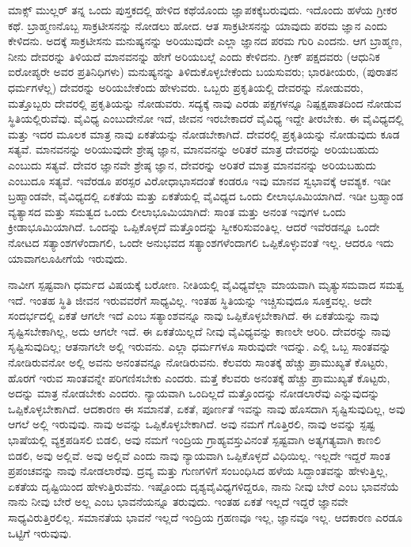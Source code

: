 \vskip 4pt

ಮಾಕ್ಸ್ ಮುಲ್ಲರ್ ತನ್ನ ಒಂದು ಪುಸ್ತಕದಲ್ಲಿ ಹೇಳಿದ ಕಥೆಯೊಂದು ಜ್ಞಾಪಕಕ್ಕೆ\break ಬರುವುದು. ಇದೊಂದು ಹಳೆಯ ಗ್ರೀಕರ ಕಥೆ. ಬ್ರಾಹ್ಮಣನೊಬ್ಬ ಸಾಕ್ರಟೀಸನನ್ನು ನೋಡಲು ಹೋದ. ಆತ ಸಾಕ್ರಟೀಸನನ್ನು ಯಾವುದು ಪರಮ ಜ್ಞಾನ ಎಂದು ಕೇಳಿದನು. ಅದಕ್ಕೆ ಸಾಕ್ರಟೀಸನು ಮನುಷ್ಯನನ್ನು ಅರಿಯುವುದೇ ಎಲ್ಲಾ ಜ್ಞಾನದ ಪರಮ ಗುರಿ ಎಂದನು. ಆಗ ಬ್ರಾಹ್ಮಣ, ನೀನು ದೇವರನ್ನು ತಿಳಿಯದೆ ಮಾನವನನ್ನು ಹೇಗೆ ಅರಿಯಬಲ್ಲೆ ಎಂದು ಕೇಳಿದನು. ಗ್ರೀಕ್ ಪಕ್ಷದವರು (ಆಧುನಿಕ ಐರೋಪ್ಯರೇ ಅವರ ಪ್ರತಿನಿಧಿಗಳು) ಮನುಷ್ಯನನ್ನು ತಿಳಿದುಕೊಳ್ಳಬೇಕೆಂದು ಬಯಸುವರು; ಭಾರತೀಯರು, (ಪುರಾತನ ಧರ್ಮಗಳೆಲ್ಲ) ದೇವರನ್ನು ಅರಿಯಬೇಕೆಂದು ಹೇಳುವರು. ಒಬ್ಬರು ಪ್ರಕೃತಿಯಲ್ಲಿ ದೇವರನ್ನು ನೋಡುವರು, ಮತ್ತೊಬ್ಬರು ದೇವರಲ್ಲಿ ಪ್ರಕೃತಿಯನ್ನು ನೋಡುವರು. ಸದ್ಯಕ್ಕೆ ನಾವು ಎರಡು ಪಕ್ಷಗಳನ್ನೂ ನಿಷ್ಪಕ್ಷಪಾತದಿಂದ ನೋಡುವ ಸ್ಥಿತಿಯಲ್ಲಿರುವೆವು. ವೈವಿಧ್ಯ ಎಂಬುದೇನೋ ಇದೆ, ಜೀವನ ಇರಬೇಕಾದರೆ ವೈವಿಧ್ಯ ಇದ್ದೇ ತೀರಬೇಕು. ಈ ವೈವಿಧ್ಯದಲ್ಲಿ ಮತ್ತು ಇದರ ಮೂಲಕ ಮಾತ್ರ ನಾವು ಏಕತೆಯನ್ನು ನೋಡಬೇಕಾಗಿದೆ. ದೇವರಲ್ಲಿ ಪ್ರಕೃತಿಯನ್ನು ನೋಡುವುದು ಕೂಡ ಸತ್ಯವೆ. ಮಾನವನನ್ನು ಅರಿಯುವುದೇ ಶ್ರೇಷ್ಠ ಜ್ಞಾನ, ಮಾನವನನ್ನು ಅರಿತರೆ ಮಾತ್ರ ದೇವರನ್ನು ಅರಿಯಬಹುದು ಎಂಬುದು ಸತ್ಯವೆ. ದೇವರ ಜ್ಞಾನವೇ ಶ್ರೇಷ್ಠ ಜ್ಞಾನ, ದೇವರನ್ನು ಅರಿತರೆ ಮಾತ್ರ ಮಾನವನನ್ನು ಅರಿಯಬಹುದು ಎಂಬುದೂ ಸತ್ಯವೆ. ಇವೆರಡೂ ಪರಸ್ಪರ ವಿರೋಧಾಭಾಸದಂತೆ ಕಂಡರೂ ಇವು ಮಾನವ ಸ್ವಭಾವಕ್ಕೆ ಆವಶ್ಯಕ. ಇಡೀ ಬ್ರಹ್ಮಾಂಡವೇ, ವೈವಿಧ್ಯದಲ್ಲಿ ಏಕತೆಯ ಮತ್ತು ಏಕತೆಯಲ್ಲಿ ವೈವಿಧ್ಯದ ಒಂದು ಲೀಲಾಭೂಮಿಯಾಗಿದೆ. ಇಡೀ ಬ್ರಹ್ಮಾಂಡ ವ್ಯತ್ಯಾಸದ ಮತ್ತು ಸಮತ್ವದ ಒಂದು ಲೀಲಾಭೂಮಿಯಾಗಿದೆ: ಸಾಂತ ಮತ್ತು ಅನಂತ ಇವುಗಳ ಒಂದು ಕ್ರೀಡಾಭೂಮಿಯಾಗಿದೆ. ಒಂದನ್ನು ಒಪ್ಪಿಕೊಳ್ಳದೆ ಮತ್ತೊಂದನ್ನು ಸ್ವೀಕರಿಸುವಂತಿಲ್ಲ. ಆದರೆ ಇವೆರಡನ್ನೂ ಒಂದೇ ನೋಟದ ಸತ್ಯಾಂಶಗಳೆಂದಾಗಲಿ, ಒಂದೇ ಅನುಭವದ ಸತ್ಯಾಂಶಗಳೆಂದಾಗಲಿ ಒಪ್ಪಿಕೊಳ್ಳುವಂತೆ ಇಲ್ಲ. ಆದರೂ ಇದು ಯಾವಾಗಲೂ\break ಹೀಗೆಯೆ ಇರುವುದು.

ನಾವೀಗ ಸ್ಪಷ್ಟವಾಗಿ ಧರ್ಮದ ವಿಷಯಕ್ಕೆ ಬರೋಣ. ನೀತಿಯಲ್ಲಿ ವೈವಿಧ್ಯವೆಲ್ಲಾ ಮಾಯವಾಗಿ ಮೃತ್ಯುಸಮವಾದ ಸಮತ್ವ ಇದೆ. ಇಂತಹ ಸ್ಥಿತಿ ಜೀವನ ಇರುವವರೆಗೆ ಸಾಧ್ಯವಿಲ್ಲ. ಇಂತಹ ಸ್ಥಿತಿಯನ್ನು ಇಚ್ಚಿಸುವುದೂ ಸೂಕ್ತವಲ್ಲ. ಅದೇ ಸಂದರ್ಭದಲ್ಲಿ ಏಕತೆ ಆಗಲೇ ಇದೆ ಎಂಬ ಸತ್ಯಾಂಶವನ್ನೂ ನಾವು ಒಪ್ಪಿಕೊಳ್ಳಬೇಕಾಗಿದೆ. ಈ ಏಕತೆಯನ್ನು ನಾವು ಸೃಷ್ಟಿಸಬೇಕಾಗಿಲ್ಲ, ಅದು ಆಗಲೇ ಇದೆ. ಈ ಏಕತೆಯಿಲ್ಲದೆ ನೀವು ವೈವಿಧ್ಯವನ್ನು ಕಾಣಲೇ ಆರಿರಿ. ದೇವರನ್ನು ನಾವು ಸೃಷ್ಟಿಸುವುದಿಲ್ಲ; ಆತನಾಗಲೇ ಅಲ್ಲಿ ಇರುವನು. ಎಲ್ಲಾ ಧರ್ಮಗಳೂ ಸಾರುವುದೇ ಇದನ್ನು. ಎಲ್ಲಿ ಒಬ್ಬ ಸಾಂತವನ್ನು ನೋಡಿರುವನೋ ಅಲ್ಲಿ ಅವನು ಅನಂತವನ್ನೂ ನೋಡಿರುವನು. ಕೆಲವರು ಸಾಂತಕ್ಕೆ ಹೆಚ್ಚು ಪ್ರಾಮುಖ್ಯತೆ ಕೊಟ್ಟರು, ಹೊರಗೆ ಇರುವ ಸಾಂತವನ್ನೇ ಪರಿಗಣಿಸಬೇಕು ಎಂದರು. ಮತ್ತೆ ಕೆಲವರು ಅನಂತಕ್ಕೆ ಹೆಚ್ಚು ಪ್ರಾಮುಖ್ಯತೆ ಕೊಟ್ಟರು, ಅದನ್ನು ಮಾತ್ರ ನೋಡಬೇಕು ಎಂದರು. ನ್ಯಾಯವಾಗಿ ಒಂದಿಲ್ಲದೆ ಮತ್ತೊಂದನ್ನು ನೋಡಲಾರೆವು ಎನ್ನುವುದನ್ನು ಒಪ್ಪಿಕೊಳ್ಳಬೇಕಾಗಿದೆ. ಆದಕಾರಣ ಈ ಸಮಾನತೆ, ಏಕತೆ, ಪೂರ್ಣತೆ ಇವನ್ನು ನಾವು ಹೊಸದಾಗಿ ಸೃಷ್ಟಿಸುವುದಿಲ್ಲ, ಅವು ಆಗಲೆ ಅಲ್ಲಿ ಇರುವುವು. ನಾವು ಅವನ್ನು ಒಪ್ಪಿಕೊಳ್ಳಬೇಕಾಗಿದೆ. ಅವು ನಮಗೆ ಗೊತ್ತಿರಲಿ, ನಾವು ಅವನ್ನು ಸ್ಪಷ್ಟ ಭಾಷೆಯಲ್ಲಿ ವ್ಯಕ್ತಪಡಿಸಲಿ ಬಿಡಲಿ, ಅವು ನಮಗೆ ಇಂದ್ರಿಯ ಗ್ರಾಹ್ಯವಸ್ತುವಿನಂತೆ ಸ್ಪಷ್ಟವಾಗಿ ಅತ್ಯಗತ್ಯವಾಗಿ ಕಾಣಲಿ ಬಿಡಲಿ, ಅವು ಅಲ್ಲಿವೆ. ಅವು ಅಲ್ಲಿವೆ ಎಂದು ನಾವು ನ್ಯಾಯವಾಗಿ ಒಪ್ಪಿಕೊಳ್ಳದೆ ವಿಧಿಯಿಲ್ಲ. ಇಲ್ಲದೇ ಇದ್ದರೆ ಸಾಂತ ಪ್ರಪಂಚವನ್ನು ನಾವು ನೋಡಲಾರೆವು. ದ್ರವ್ಯ ಮತ್ತು ಗುಣಗಳಿಗೆ ಸಂಬಂಧಿಸಿದ ಹಳೆಯ ಸಿದ್ದಾಂತವನ್ನು ಹೇಳುತ್ತಿಲ್ಲ, ಏಕತೆಯ ದೃಷ್ಟಿಯಿಂದ ಹೇಳುತ್ತಿರುವೆನು. ಇಷ್ಟೊಂದು ದೃಶ್ಯವೈವಿಧ್ಯಗಳಿದ್ದರೂ, ನಾನು ನೀವು ಬೇರೆ ಎಂಬ ಭಾವನೆಯೆ ನಾನು ನೀವು ಬೇರೆ ಅಲ್ಲ ಎಂಬ ಭಾವನೆಯನ್ನೂ ತರುವುದು. ಇಂತಹ ಏಕತೆ ಇಲ್ಲದೆ ಇದ್ದರೆ ಜ್ಞಾನವೇ ಸಾಧ್ಯವಿರುತ್ತಿರಲಿಲ್ಲ. ಸಮಾನತೆಯ ಭಾವನೆ ಇಲ್ಲದೆ ಇಂದ್ರಿಯ ಗ್ರಹಣವೂ ಇಲ್ಲ, ಜ್ಞಾನವೂ ಇಲ್ಲ. ಆದಕಾರಣ ಎರಡೂ ಒಟ್ಟಿಗೆ ಇರುವುವು.

